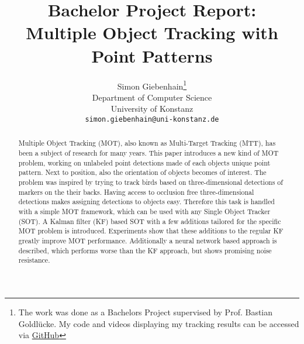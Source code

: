 \documentclass[12pt,a4paper]{article}
\title{Bachelor Project Report: \\ Multiple Object Tracking with Point Patterns}
\author{
  Simon Giebenhain\thanks{The work was done as a Bachelors Project supervised by Prof. Bastian Goldlücke. My code and videos displaying my tracking results can be accessed via \href{https://github.com/SimonGiebenhain/tracking}{GitHub}} \\
  Department of Computer Science\\
  University of Konstanz\\
  \texttt{simon.giebenhain@uni-konstanz.de} \\
}
\begin{document}
\maketitle
\newpage
\begin{abstract}
Multiple Object Tracking (MOT), also known as Multi-Target Tracking (MTT),  has been a subject of research for many years. This paper introduces a new kind of MOT problem, working on unlabeled point detections made of each objects unique point pattern. Next to position, also the orientation of objects becomes of interest. The problem was inspired by trying to track birds based on three-dimensional detections of markers on the their backs. Having access to occlusion free three-dimensional detections makes assigning detections to objects easy. Therefore this task is handled with a simple MOT framework, which can be used with any Single Object Tracker (SOT). A Kalman filter (KF) based SOT with a few additions tailored for the specific MOT problem is introduced. Experiments show that these additions to the regular KF greatly improve MOT performance. Additionally a neural network based approach is described, which performs worse than the KF approach, but shows promising noise resistance.
\end{abstract}
\newpage
\tableofcontents
\newpage


\end{document}
